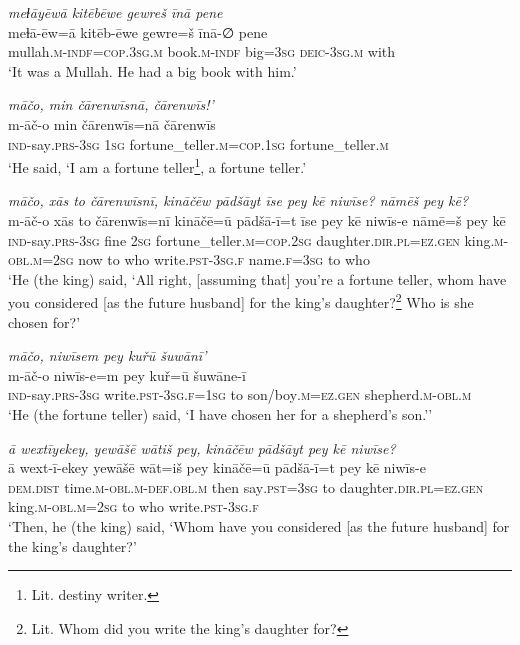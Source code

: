 \ea \label{KŠ.8}
\textit{meɫāyēwā kitēbēwe gewreš īnā pene} \\ 
\gll meɫā-ēw=ā kitēb-ēwe gewre=š īnā-∅ pene \\ 
 mullah\textsc{.m}\textsc{-indf}\textsc{=cop}\textsc{.3sg}\textsc{.m} book\textsc{.m}\textsc{-indf} big\textsc{=3sg} \textsc{deic}\textsc{-3sg}\textsc{.m} with \\ 
\glt `It was a Mullah. He had a big book with him.'
\z 
 
\ea \label{KŠ.11}
\textit{māčo, min čārenwīsnā, čārenwīs!’} \\ 
\gll m-āč-o min čārenwīs=nā čārenwīs \\ 
 \textsc{ind-}say\textsc{.prs}\textsc{-3sg} \textsc{1sg} fortune\_teller\textsc{.m}\textsc{=cop}\textsc{.\textsc{1sg}} fortune\_teller\textsc{.m} \\ 
\glt `He said, ‘I am a fortune teller\footnote{Lit. destiny writer.}, a fortune teller.'
\z 
 
\ea \label{KŠ.12}
\textit{māčo, xās to čārenwīsnī, kināčēw pādšāyt īse pey kē niwīse? nāmēš pey kē?} \\ 
\gll m-āč-o xās to čārenwīs=nī kināčē=ū pādšā-ī=t īse pey kē niwīs-e nāmē=š pey kē \\ 
 \textsc{ind-}say\textsc{.prs}\textsc{-3sg} fine \textsc{2sg} fortune\_teller\textsc{.m}\textsc{=cop}\textsc{.\textsc{2sg}} daughter\textsc{.dir}\textsc{.pl}\textsc{=ez.gen} king\textsc{.m}\textsc{-obl}\textsc{.m}\textsc{=\textsc{2sg}} now to who write\textsc{.pst}\textsc{-3sg}\textsc{.f} name\textsc{.f}\textsc{=3sg} to who \\ 
\glt `He (the king) said, ‘All right, [assuming that] you’re a fortune teller, whom have you considered [as the future husband] for the king’s daughter?\footnote{Lit. Whom did you write the king’s daughter for?} Who is she chosen for?'
\z 
 
\ea \label{KŠ.13}
\textit{māčo, niwīsem pey kuřū šuwānī’} \\ 
\gll m-āč-o niwīs-e=m pey kuř=ū šuwāne-ī \\ 
 \textsc{ind-}say\textsc{.prs}\textsc{-3sg} write\textsc{.pst}\textsc{-3sg}\textsc{.f}\textsc{=\textsc{1sg}} to son/boy\textsc{.m}\textsc{=ez.gen} shepherd\textsc{.m}\textsc{-obl}\textsc{.m} \\ 
\glt `He (the fortune teller) said, ‘I have chosen her for a shepherd’s son.’'
\z 
 
\ea \label{KŠ.15}
\textit{ā wextīyekey, yewāšē wātiš pey, kināčēw pādšāyt pey kē niwīse?} \\ 
\gll ā wext-ī-ekey yewāšē wāt=iš pey kināčē=ū pādšā-ī=t pey kē niwīs-e \\ 
 \textsc{dem.dist} time\textsc{.m}\textsc{-obl}\textsc{.m}\textsc{-def}\textsc{.obl}\textsc{.m} then say\textsc{.pst}\textsc{=3sg} to daughter\textsc{.dir}\textsc{.pl}\textsc{=ez.gen} king\textsc{.m}\textsc{-obl}\textsc{.m}\textsc{=\textsc{2sg}} to who write\textsc{.pst}\textsc{-3sg}\textsc{.f} \\ 
\glt `Then, he (the king) said, ‘Whom have you considered [as the future husband] for the king’s daughter?'
\z 
 
